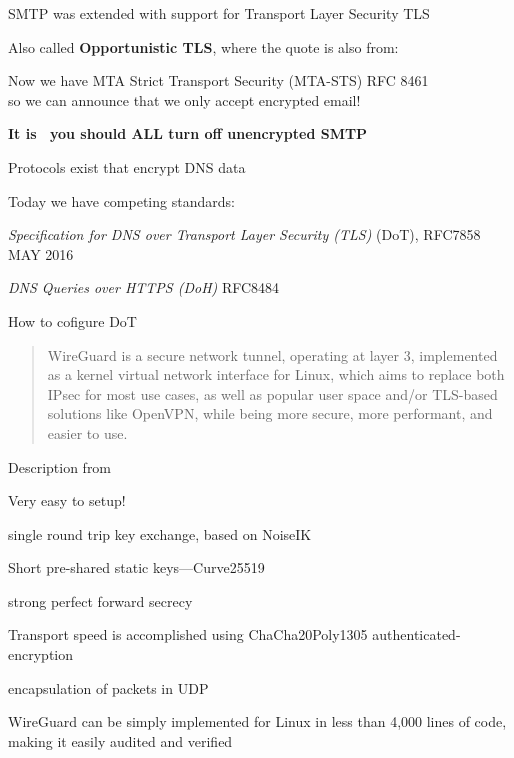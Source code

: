 \documentclass[Screen16to9,17pt]{foils}
\begin{document}
\begin{list1}
\item SMTP was extended with support for Transport Layer Security TLS
\item Also called {\bf Opportunistic TLS}, where the quote is also from:\\ 
\item Now we have MTA Strict Transport Security (MTA-STS) RFC 8461\\
so we can announce that we only accept encrypted email!
\item {\bf It is \the\year\ you should ALL turn off unencrypted SMTP} {\myalert}
\end{list1}



\begin{list2}
\item Protocols exist that encrypt DNS data
\item Today we have competing standards:
\item
\emph{Specification for DNS over Transport Layer Security (TLS)} (DoT), RFC7858 MAY 2016\\

\item \emph{DNS Queries over HTTPS (DoH)} RFC8484

\item How to cofigure DoT\\ 
\end{list2}




\begin{quote}\small
WireGuard is a secure network tunnel, operating at layer 3, implemented as a kernel virtual network interface for Linux, which aims to replace both IPsec for most use cases, as well as popular user space and/or TLS-based solutions like OpenVPN, while being more secure, more performant, and easier to use.
\end{quote}

Description from 

\begin{list2}
\item Very easy to setup!
\item single round trip key exchange, based on NoiseIK
\item Short pre-shared static keys—Curve25519
\item strong perfect forward secrecy
\item Transport
speed is accomplished using ChaCha20Poly1305 authenticated-encryption
\item encapsulation of packets in UDP
\item WireGuard can be
simply implemented for Linux in less than 4,000 lines of code, making it easily audited and verified
\end{list2}
\end{document}
